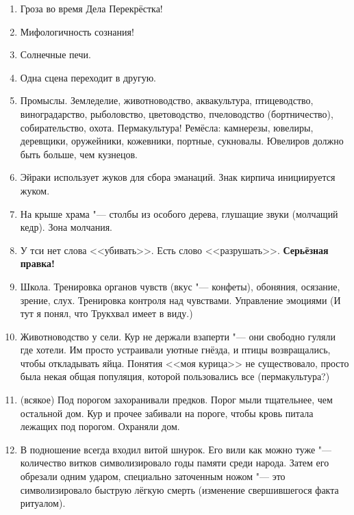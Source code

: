 \begin{enumerate}
\item Гроза во время Дела Перекрёстка!

\item Мифологичность сознания!

\item Солнечные печи.

\item Одна сцена переходит в другую.

\item Промыслы.
Земледелие, животноводство, аквакультура, птицеводство, виноградарство, рыболовство, цветоводство, пчеловодство (бортничество), собирательство, охота.
Пермакультура!
Ремёсла: камнерезы, ювелиры, деревщики, оружейники, кожевники, портные, сукновалы.
Ювелиров должно быть больше, чем кузнецов.

\item Эйраки использует жуков для сбора эманаций.
Знак кирпича инициируется жуком.

\item На крыше храма "--- столбы из особого дерева, глушащие звуки (молчащий кедр).
Зона молчания.

\item У тси нет слова <<убивать>>.
Есть слово <<разрушать>>.
\textbf{Серьёзная правка!}

\item Школа.
Тренировка органов чувств (вкус "--- конфеты), обоняния, осязание, зрение, слух.
Тренировка контроля над чувствами.
Управление эмоциями (И тут я понял, что Трукхвал имеет в виду.)

\item Животноводство у сели.
Кур не держали взаперти "--- они свободно гуляли где хотели.
Им просто устраивали уютные гнёзда, и птицы возвращались, чтобы откладывать яйца.
Понятия <<моя курица>> не существовало, просто была некая общая популяция, которой пользовались все (пермакультура?)

\item (всякое) Под порогом захоранивали предков.
Порог мыли тщательнее, чем остальной дом.
Кур и прочее забивали на пороге, чтобы кровь питала лежащих под порогом.
Охраняли дом.

\item В подношение всегда входил витой шнурок.
Его вили как можно туже "--- количество витков символизировало годы памяти среди народа.
Затем его обрезали одним ударом, специально заточенным ножом "--- это символизировало быструю лёгкую смерть (изменение свершившегося факта ритуалом).


\end{enumerate}

